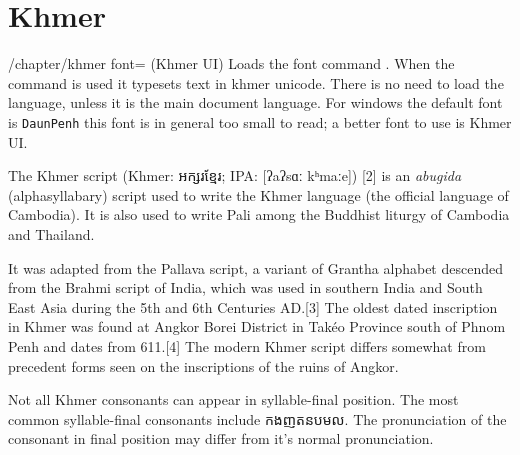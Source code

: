\section{Khmer}
\newfontfamily{}
\normaltext

\newfontfamily{}
\def\khmertext#1{{\khmer#1}}

\begin{key}{/chapter/khmer font= (Khmer  UI)} Loads the font
command \cmd{\khmer}. When the command is used it typesets text in
khmer unicode. There is no need to load the language, unless it is the main document language. For windows the default font is \texttt{DaunPenh} this font is in general too small to read; a better font to use is Khmer UI.
\end{key}




The Khmer script (Khmer: {\Large\khmertext{អក្សរខ្មែរ}}; IPA: [ʔaʔsɑː kʰmaːe]) [2] is an \textit{abugida} (alphasyllabary) script used to write the Khmer language (the official language of Cambodia). It is also used to write Pali among the Buddhist liturgy of Cambodia and Thailand.

It was adapted from the Pallava script, a variant of Grantha alphabet descended from the Brahmi script of India, which was used in southern India and South East Asia during the 5th and 6th Centuries AD.[3] The oldest dated inscription in Khmer was found at Angkor Borei District in Takéo Province south of Phnom Penh and dates from 611.[4] The modern Khmer script differs somewhat from precedent forms seen on the inscriptions of the ruins of Angkor.

Not all Khmer consonants can appear in syllable-final position. The most common syllable-final consonants include {\khmer កងញតនបមល}. The pronunciation of the consonant in final position may differ from it's normal pronunciation.


